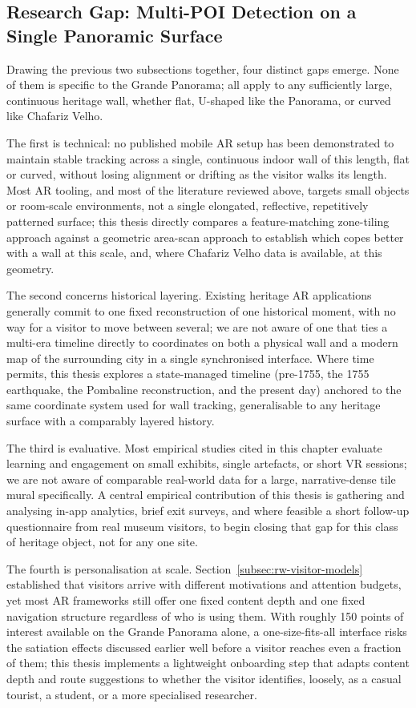 \subsection{Research Gap: Multi-POI Detection on a Single Panoramic Surface}
\label{subsec:rw-gap}
 
Drawing the previous two subsections together, four distinct gaps
emerge. None of them is specific to the Grande Panorama; all apply to
any sufficiently large, continuous heritage wall, whether flat, U-shaped
like the Panorama, or curved like Chafariz Velho.
 
The first is technical: no published mobile AR setup has been
demonstrated to maintain stable tracking across a single, continuous
indoor wall of this length, flat or curved, without losing alignment or
drifting as the visitor walks its length. Most AR tooling, and most of
the literature reviewed above, targets small objects or room-scale
environments, not a single elongated, reflective, repetitively
patterned surface; this thesis directly compares a feature-matching
zone-tiling approach against a geometric area-scan approach to establish
which copes better with a wall at this scale, and, where Chafariz Velho
data is available, at this geometry.
 
The second concerns historical layering. Existing heritage AR
applications generally commit to one fixed reconstruction of one
historical moment, with no way for a visitor to move between several;
we are not aware of one that ties a multi-era timeline directly to coordinates
on both a physical wall and a modern map of the surrounding city in a
single synchronised interface. Where time permits, this thesis explores
a state-managed timeline (pre-1755, the 1755 earthquake, the Pombaline
reconstruction, and the present day) anchored to the same coordinate
system used for wall tracking, generalisable to any heritage surface with
a comparably layered history.
 
The third is evaluative. Most empirical studies cited in this chapter
evaluate learning and engagement on small exhibits, single artefacts, or
short VR sessions; we are not aware of comparable real-world data for a
large, narrative-dense tile mural specifically. A central empirical
contribution of this thesis is gathering and analysing in-app analytics,
brief exit surveys, and where feasible a short follow-up questionnaire
from real museum visitors, to begin closing that gap for this class of
heritage object, not for any one site.
 
The fourth is personalisation at scale. Section~\ref{subsec:rw-visitor-models}
established that visitors arrive with different motivations and
attention budgets, yet most AR frameworks still offer one fixed content
depth and one fixed navigation structure regardless of who is using them.
With roughly 150 points of interest available on the Grande Panorama
alone, a one-size-fits-all interface risks the satiation effects
discussed earlier well before a visitor reaches even a fraction of them;
this thesis implements a lightweight onboarding step that adapts content
depth and route suggestions to whether the visitor identifies, loosely,
as a casual tourist, a student, or a more specialised researcher.
 
